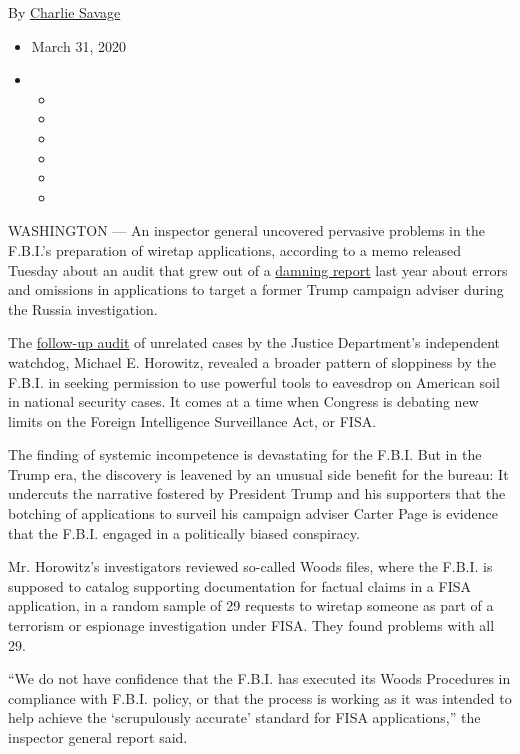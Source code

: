 By \href{https://www.nytimes3xbfgragh.onion/by/charlie-savage}{Charlie
Savage}

\begin{itemize}
\item
  March 31, 2020
\item
  \begin{itemize}
  \item
  \item
  \item
  \item
  \item
  \item
  \end{itemize}
\end{itemize}

WASHINGTON --- An inspector general uncovered pervasive problems in the
F.B.I.'s preparation of wiretap applications, according to a memo
released Tuesday about an audit that grew out of a
\href{https://www.nytimes3xbfgragh.onion/2019/12/11/us/politics/fisa-surveillance-fbi.html?action=click\&module=RelatedLinks\&pgtype=Article}{damning
report} last year about errors and omissions in applications to target a
former Trump campaign adviser during the Russia investigation.

The \href{https://oig.justice.gov/reports/2020/a20047.pdf}{follow-up
audit} of unrelated cases by the Justice Department's independent
watchdog, Michael E. Horowitz, revealed a broader pattern of sloppiness
by the F.B.I. in seeking permission to use powerful tools to eavesdrop
on American soil in national security cases. It comes at a time when
Congress is debating new limits on the Foreign Intelligence Surveillance
Act, or FISA.

The finding of systemic incompetence is devastating for the F.B.I. But
in the Trump era, the discovery is leavened by an unusual side benefit
for the bureau: It undercuts the narrative fostered by President Trump
and his supporters that the botching of applications to surveil his
campaign adviser Carter Page is evidence that the F.B.I. engaged in a
politically biased conspiracy.

Mr. Horowitz's investigators reviewed so-called Woods files, where the
F.B.I. is supposed to catalog supporting documentation for factual
claims in a FISA application, in a random sample of 29 requests to
wiretap someone as part of a terrorism or espionage investigation under
FISA. They found problems with all 29.

``We do not have confidence that the F.B.I. has executed its Woods
Procedures in compliance with F.B.I. policy, or that the process is
working as it was intended to help achieve the `scrupulously accurate'
standard for FISA applications,'' the inspector general report said.


